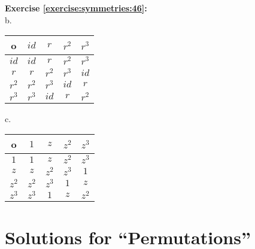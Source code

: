 \hfill\\
\hfill\\
\textbf{Exercise \ref{exercise:symmetries:46}:}\\
b.
\begin{center}
	\begin{tabular}{c| c c c c}
		o & $id$ & $r$ & $r^2$ & $r^3$\\
		\hline
		$id$ & $id$ & $r$ & $r^2$ & $r^3$\\
		$r$ & $r$ & $r^2$ & $r^3$ & $id$\\
		$r^2$ & $r^2$ & $r^3$ & $id$ & $r$\\
		$r^3$ & $r^3$ & $id$ & $r$ & $r^2$
	\end{tabular}
\end{center}
c.
\begin{center}
	\begin{tabular}{c| c c c c}
		o & $1$ & $z$ & $z^2$ & $z^3$\\
		\hline
		$1$ & $1$ & $z$ & $z^2$ & $z^3$\\
		$z$ & $z$ & $z^2$ & $z^3$ & $1$\\
		$z^2$ & $z^2$ & $z^3$ & $1$ & $z$\\
		$z^3$ & $z^3$ & $1$ & $z$ & $z^2$
	\end{tabular}
\end{center}

\section{Solutions for ``Permutations''}
\noindent{}\bigskip

